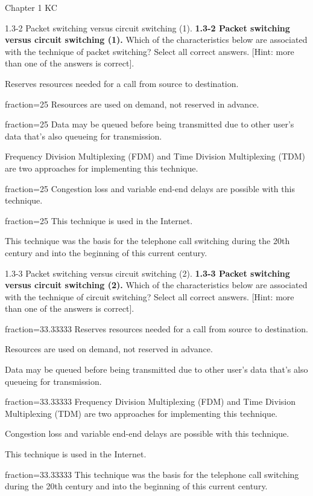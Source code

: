 \documentclass[a4paper]{article}
\begin{document}
\begin{quiz}{Chapter 1 KC}
\begin{multi}[points=1,multiple]{1.3-2 Packet switching versus circuit switching (1).}
\textbf{1.3-2 Packet switching versus circuit switching (1).} 
Which of the characteristics below are associated with the technique of packet switching? Select all correct answers. [Hint: more than one of the answers is correct].
\item Reserves resources needed for a call from source to destination.
\item[fraction=25] Resources are used on demand, not reserved in advance.
\item[fraction=25] Data may be queued before being transmitted due to other user's data that's also queueing for transmission.
\item Frequency Division Multiplexing (FDM) and Time Division Multiplexing (TDM) are two approaches for implementing this technique.
\item[fraction=25] Congestion loss and variable end-end delays are possible with this technique.
\item[fraction=25] This technique is used in the Internet.
\item This technique was the basis for the telephone call switching during the 20th century and into the beginning of this current century.
\end{multi}

\begin{multi}[points=1,multiple]{1.3-3 Packet switching versus circuit switching (2).}
\textbf{1.3-3 Packet switching versus circuit switching (2).} 
Which of the characteristics below are associated with the technique of circuit switching? Select all correct answers. [Hint: more than one of the answers is correct].
\item[fraction=33.33333] Reserves resources needed for a call from source to destination.
\item Resources are used on demand, not reserved in advance.
\item Data may be queued before being transmitted due to other user's data that's also queueing for transmission.
\item[fraction=33.33333] Frequency Division Multiplexing (FDM) and Time Division Multiplexing (TDM) are two approaches for implementing this technique.
\item Congestion loss and variable end-end delays are possible with this technique.
\item This technique is used in the Internet.
\item[fraction=33.33333] This technique was the basis for the telephone call switching during the 20th century and into the beginning of this current century.
\end{multi}


\end{quiz}
\end{document}
